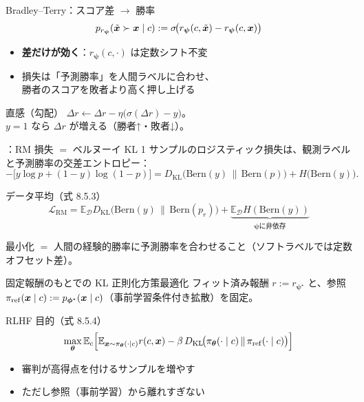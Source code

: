 \asmain
\begin{frame}{Bradley--Terry：スコア差 $\to$ 勝率}
    \[
        p_{r_{\bm{\psi}}}(\tilde{\bm{x}}\succ\bm{x}\mid c)
        :=
        \sigma\!\bigl(r_{\bm{\psi}}(c,\tilde{\bm{x}})-r_{\bm{\psi}}(c,\bm{x})\bigr)
    \]
    \begin{itemize}
        \item \textbf{差だけが効く}：$r_{\bm{\psi}}(c,\cdot)$ は定数シフト不変
        \item 損失は「予測勝率」を人間ラベルに合わせ、\\
        勝者のスコアを敗者より高く押し上げる
    \end{itemize}
    \begin{alertblock}{直感（勾配）}
        $\Delta r\leftarrow\Delta r-\eta\bigl(\sigma(\Delta r)-y\bigr)$。\\
        $y=1$ なら $\Delta r$ が増える（勝者↑・敗者↓）。
    \end{alertblock}
\end{frame}
\assuppl
\begin{frame}{\supplmark：RM 損失 $=$ ベルヌーイ KL}
    1 サンプルのロジスティック損失は、観測ラベルと予測勝率の交差エントロピー：
    \[
        -\bigl[y\log p+(1-y)\log(1-p)\bigr]
        =
        D_{\mathrm{KL}}\!\bigl(\mathrm{Bern}(y)\,\|\,\mathrm{Bern}(p)\bigr)
        +H\!\bigl(\mathrm{Bern}(y)\bigr).
    \]
    \begin{block}{データ平均（式 8.5.3）}
        \[
            \mathcal{L}_{\mathrm{RM}}
            =
            \mathbb{E}_{\mathcal{D}}
            D_{\mathrm{KL}}\!\bigl(\mathrm{Bern}(y)\,\|\,\mathrm{Bern}(p_{r})\bigr)
            +
            \underbrace{\mathbb{E}_{\mathcal{D}} H(\mathrm{Bern}(y))}_{\bm{\psi}\text{に非依存}}
        \]
    \end{block}
    最小化 $=$ 人間の経験的勝率に予測勝率を合わせること（ソフトラベルでは定数オフセット差）。
\end{frame}
\asmain
\begin{frame}{固定報酬のもとでの KL 正則化方策最適化}
    フィット済み報酬 $r:=r_{\bm{\psi}^\star}$ と、参照 $\pi_{\mathrm{ref}}(\bm{x}\mid c):=p_{\bm{\phi}^\star}(\bm{x}\mid c)$（事前学習条件付き拡散）を固定。
    \begin{block}{RLHF 目的（式 8.5.4）}
        \[
            \max_{\bm{\theta}}
            \mathbb{E}_{c}
            \Bigl[
            \mathbb{E}_{\bm{x}\sim\pi_{\bm{\theta}}(\cdot\mid c)}
            r(c,\bm{x})
            -
            \beta\,
            D_{\mathrm{KL}}\!\bigl(
            \pi_{\bm{\theta}}(\cdot\mid c)\,\|\,\pi_{\mathrm{ref}}(\cdot\mid c)
            \bigr)
            \Bigr]
        \]
    \end{block}
    \begin{itemize}
        \item 審判が高得点を付けるサンプルを増やす
        \item ただし参照（事前学習）から離れすぎない
    \end{itemize}
\end{frame}
